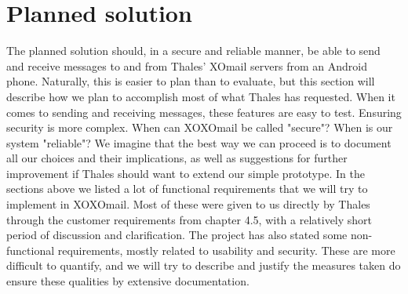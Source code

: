 \section{Planned solution}

The planned solution should, in a secure and reliable manner, be able to send and receive messages to and from Thales' XOmail servers from an Android phone. Naturally, this is easier to plan than to evaluate, but this section will describe how we plan to accomplish most of what Thales has requested.
\newline
\newline
When it comes to sending and receiving messages, these features are easy to test. Ensuring security is more complex. When can XOXOmail be called "secure"? When is our system "reliable"? We imagine that the best way we can proceed is to document all our choices and their implications, as well as suggestions for further improvement if Thales should want to extend our simple prototype.
\newline
\newline
In the sections above we listed a lot of functional requirements that we will try to implement in XOXOmail. Most of these were given to us directly by Thales through the customer requirements from chapter 4.5, with a relatively short period of discussion and clarification.
\newline
\newline
The project has also stated some non-functional requirements, mostly related to usability and security. These are more difficult to quantify, and we will try to describe and justify the measures taken do ensure these qualities by extensive documentation.